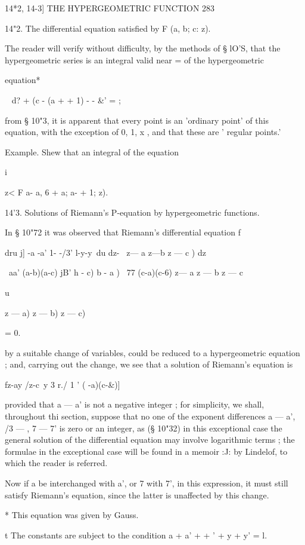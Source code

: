 14*2, 14-3] THE HYPERGEOMETRIC FUNCTION 283

14"2. The differential equation satisfied by F (a, b; c: z).

The reader will verify without difficulty, by the methods of § lO'S,
that the hypergeometric series is an integral valid near = of the
hypergeometric

equation*

   ~ d? + (c - (a + + 1) - - \&' = ;

from § 10"3, it is apparent that every point is an 'ordinary point' of
this equation, with the exception of 0, 1, x , and that these are '
regular points.'

Example. Shew that an integral of the equation

i

z< F a- a, 6 + a; a- + 1; z).

14'3. Solutions of Riemann's P-equation by hypergeometric functions.

In § 10"72 it was observed that Riemann's differential equation f

dru j] -a -a' 1- -/3' l-y-y\ du dz- \ z— a z—b z — c ) dz

\ aa' (a-b)(a-c) jB' h - c) b - a ) \ 77 (c-a)(c-6) z— a z — b z — c

u

 z — a) z — b) z — c)

= 0.

by a suitable change of variables, could be reduced to a
hypergeometric equation ; and, carrying out the change, we see that a
solution of Riemann's equation is

fz-ay /z-c\ y 3 r./ 1 ' ( -a)(c-\&)]

provided that a — a' is not a negative integer ; for simplicity, we
shall, throughout thi section, suppose that no one of the exponent
differences a — a', /3 — , 7 — 7' is zero or an integer, as (§ 10"32)
in this exceptional case the general solution of the differential
equation may involve logarithmic terms ; the formulae in the
exceptional case will be found in a memoir :J: by Lindelof, to which
the reader is referred.

Now if a be interchanged with a', or 7 with 7', in this expression, it
must still satisfy Riemann's equation, since the latter is unaffected
by this change.

* This equation was given by Gauss.

t The constants are subject to the condition a + a' + + ' + y + y' =
l.

